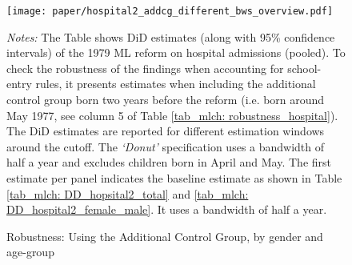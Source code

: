 \begin{landscape}
	\vspace*{\fill}
	\begin{figure}[H]\centering
		\texttt{[image: paper/hospital2\_addcg\_different\_bws\_overview.pdf]}
		\scriptsize
		\begin{minipage}{0.95\linewidth}
			\caption{Robustness: Using the Additional Control Group, by gender and age-group}\label{fig_mlch: hospital2_addcg_bws_age-group_gender}
			\emph{Notes:} The Table shows DiD estimates (along with 95\% confidence intervals) of the 1979 ML reform on hospital admissions (pooled). To check the robustness of the findings when accounting for school-entry rules, it presents estimates when including the additional control group born two years before the reform (i.e. born around May 1977, see column 5 of Table \ref{tab_mlch: robustness_hospital}). The DiD estimates are reported for different estimation windows around the cutoff. The \textit{`Donut'} specification uses a bandwidth of half a year and excludes children born in April and May. The first estimate per panel indicates the baseline estimate as shown in Table \ref{tab_mlch: DD_hopsital2_total} and \ref{tab_mlch: DD_hospital2_female_male}. It uses a bandwidth of half a year.
		\end{minipage}
	\end{figure}
	\vspace*{\fill}\clearpage
\end{landscape}








